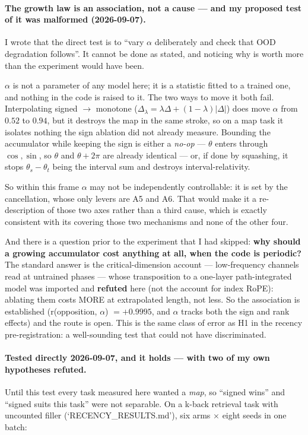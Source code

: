 \documentclass[11pt]{article}
\begin{document}
\paragraph{The growth law is an association, not a cause --- and my proposed test
of it was malformed (2026-09-07).} I wrote that the direct test is to ``vary
$\alpha$ deliberately and check that OOD degradation follows''. It cannot be done as
stated, and noticing why is worth more than the experiment would have been.

$\alpha$ is not a parameter of any model here; it is a statistic fitted to a trained
one, and nothing in the code is raised to it. The two ways to move it both fail.
Interpolating signed $\to$ monotone ($\Delta_\lambda = \lambda\Delta +
(1-\lambda)|\Delta|$) does move $\alpha$ from $0.52$ to $0.94$, but it destroys the
map in the same stroke, so on a map task it isolates nothing the sign ablation did
not already measure. Bounding the accumulator while keeping the sign is either a
\emph{no-op} --- $\theta$ enters through $\cos,\sin$, so $\theta$ and $\theta+2\pi$
are already identical --- or, if done by squashing, it stops $\theta_s-\theta_t$
being the interval sum and destroys interval-relativity.

So within this frame $\alpha$ may not be independently controllable: it is set by
the cancellation, whose only levers are A5 and A6. That would make it a
re-description of those two axes rather than a third cause, which is exactly
consistent with its covering those two mechanisms and none of the other four.

And there is a question prior to the experiment that I had skipped: \textbf{why
should a growing accumulator cost anything at all, when the code is periodic?} The
standard answer is the critical-dimension account --- low-frequency channels read at
untrained phases --- whose transposition to a one-layer path-integrated model was
imported and \textbf{refuted} here (not the account for index RoPE): ablating them
costs MORE at extrapolated length, not less. So the association is established
(r(opposition, $\alpha$) $= +0.9995$, and $\alpha$ tracks both the sign and rank
effects) and the route is open. This is the same class of error as H1 in the
recency pre-registration: a well-sounding test that could not have discriminated.

\paragraph{Tested directly 2026-09-07, and it holds --- with two of my own
hypotheses refuted.} Until this test every task measured here wanted a \emph{map},
so ``signed wins'' and ``signed suits this task'' were not separable. On a k-back
retrieval task with uncounted filler (`RECENCY\_RESULTS.md'), six arms $\times$
eight seeds in one batch:
\end{document}
